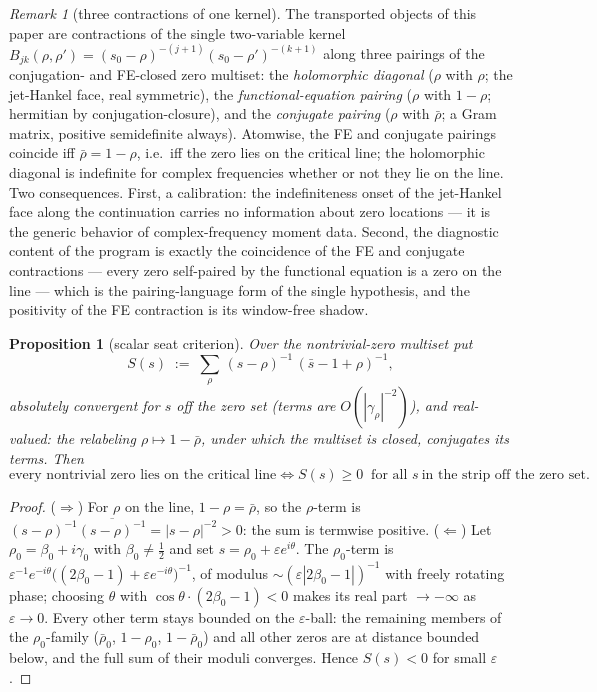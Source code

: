 \documentclass[11pt]{article}
\theoremstyle{plain}
\newtheorem{proposition}[theorem]{Proposition}
\theoremstyle{definition}
\theoremstyle{remark}
\newtheorem{remark}[theorem]{Remark}
\begin{document}
\begin{remark}[three contractions of one kernel]\label{rem:contractions}
The transported objects of this paper are contractions of the single two-variable
kernel $B_{jk}(\rho,\rho')=(s_0-\rho)^{-(j+1)}(s_0-\rho')^{-(k+1)}$ along three
pairings of the conjugation- and FE-closed zero multiset: the \emph{holomorphic
diagonal} ($\rho$ with $\rho$; the jet-Hankel face, real symmetric), the
\emph{functional-equation pairing} ($\rho$ with $1-\rho$; hermitian by
conjugation-closure), and the \emph{conjugate pairing} ($\rho$ with $\bar\rho$; a
Gram matrix, positive semidefinite always). Atomwise, the FE and conjugate pairings
coincide iff $\bar\rho=1-\rho$, i.e.\ iff the zero lies on the critical line; the
holomorphic diagonal is indefinite for complex frequencies whether or not they lie on
the line. Two consequences. First, a calibration: the indefiniteness onset of the
jet-Hankel face along the continuation carries no information about zero locations
--- it is the generic behavior of complex-frequency moment data. Second, the
diagnostic content of the program is exactly the coincidence of the FE and conjugate
contractions --- every zero self-paired by the functional equation is a zero on the
line --- which is the pairing-language form of the single hypothesis, and the
positivity of the FE contraction is its window-free shadow.
\end{remark}

\begin{proposition}[scalar seat criterion]\label{prop:scalarseat}
Over the nontrivial-zero multiset put
\[
  S(s)\;:=\;\sum_{\rho}\,(s-\rho)^{-1}\,(\bar s-1+\rho)^{-1},
\]
absolutely convergent for $s$ off the zero set (terms are $O(|\gamma_\rho|^{-2})$),
and real-valued: the relabeling $\rho\mapsto1-\bar\rho$, under which the multiset is
closed, conjugates its terms. Then
\[
  \text{every nontrivial zero lies on the critical line}
  \iff
  S(s)\ge0\ \text{ for all }s\ \text{in the strip off the zero set.}
\]
\end{proposition}

\begin{proof}
($\Rightarrow$) For $\rho$ on the line, $1-\rho=\bar\rho$, so the $\rho$-term is
$(s-\rho)^{-1}\overline{(s-\rho)^{-1}}=|s-\rho|^{-2}>0$: the sum is termwise
positive. ($\Leftarrow$) Let $\rho_0=\beta_0+i\gamma_0$ with $\beta_0\ne\tfrac12$ and
set $s=\rho_0+\varepsilon e^{i\theta}$. The $\rho_0$-term is
$\varepsilon^{-1}e^{-i\theta}\bigl((2\beta_0-1)+\varepsilon e^{-i\theta}\bigr)^{-1}$,
of modulus $\sim(\varepsilon|2\beta_0-1|)^{-1}$ with freely rotating phase; choosing
$\theta$ with $\cos\theta\cdot(2\beta_0-1)<0$ makes its real part $\to-\infty$ as
$\varepsilon\to0$. Every other term stays bounded on the $\varepsilon$-ball: the
remaining members of the $\rho_0$-family ($\bar\rho_0$, $1-\rho_0$, $1-\bar\rho_0$)
and all other zeros are at distance bounded below, and the full sum of their moduli
converges. Hence $S(s)<0$ for small $\varepsilon$.
\end{proof}
\end{document}
